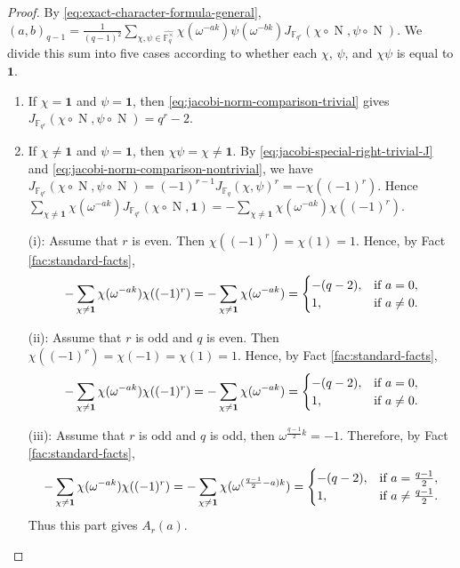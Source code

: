 \documentclass[10pt,a4paper]{article}
\newcommand{\Norm}{\operatorname{N}}
\newcommand{\one}{\mathbf{1}}
\numberwithin{equation}{section}
\begin{document}
\begin{proof}
By \eqref{eq:exact-character-formula-general},
$(a,b)_{q-1}=\frac{1}{(q-1)^2}\sum_{\chi,\psi\in\widehat{\mathbb{F}_q^\times}}\chi(\omega^{-ak})\psi(\omega^{-bk})J_{\mathbb{F}_{q^r}}(\chi\circ \Norm,\psi\circ \Norm)$.
We divide this sum into five cases according to whether each $\chi$, $\psi$, and $\chi\psi$ is equal to $\one$.

\begin{enumerate}
\item[\textup{(1)}:]
If $\chi=\one$ and $\psi=\one$, then \eqref{eq:jacobi-norm-comparison-trivial} gives
$J_{\mathbb{F}_{q^r}}(\chi\circ \Norm,\psi\circ \Norm)=q^r-2$.

\item[\textup{(2)}:]
If $\chi\neq \one$ and $\psi=\one$, then $\chi\psi=\chi\neq \one$. By \eqref{eq:jacobi-special-right-trivial-J} and \eqref{eq:jacobi-norm-comparison-nontrivial}, we have
$J_{\mathbb{F}_{q^r}}(\chi\circ \Norm,\psi\circ \Norm)=(-1)^{r-1}J_{\mathbb{F}_q}(\chi,\psi)^r=-\chi((-1)^r)$. Hence
$\sum_{\chi\neq\one}
\chi(\omega^{-ak})
J_{\mathbb{F}_{q^r}}(\chi\circ\Norm,\one)
=
-\sum_{\chi\neq\one}\chi(\omega^{-ak})\chi((-1)^r)$.

\textup{(i):} Assume that $r$ is even. Then $\chi((-1)^r)=\chi(1)=1$. Hence, by Fact \ref{fac:standard-facts},
\[
-\sum_{\chi\neq\one}\chi(\omega^{-ak})\chi((-1)^r)
=
-\sum_{\chi\neq\one}\chi(\omega^{-ak})
=
\begin{cases}
-(q-2), & \textup{if } a=0,\\
1, & \textup{if } a\neq0.
\end{cases}
\]

\textup{(ii):} Assume that $r$ is odd and $q$ is even. Then $\chi((-1)^r)=\chi(-1)=\chi(1)=1$. Hence, by Fact \ref{fac:standard-facts},
\[
-\sum_{\chi\neq\one}\chi(\omega^{-ak})\chi((-1)^r)
=
-\sum_{\chi\neq\one}\chi(\omega^{-ak})
=
\begin{cases}
-(q-2), & \textup{if } a=0,\\
1, & \textup{if } a\neq0.
\end{cases}
\]

\textup{(iii):} Assume that $r$ is odd and $q$ is odd, then $\omega^{\frac{q-1}{2}k}=-1$. Therefore, by Fact \ref{fac:standard-facts},
\[
-\sum_{\chi\neq\one}\chi(\omega^{-ak})\chi((-1)^r)
=
-\sum_{\chi\neq\one}\chi(\omega^{(\frac{q-1}{2}-a)k})
=
\begin{cases}
-(q-2), & \textup{if } a=\frac{q-1}{2},\\
1, & \textup{if } a\neq\frac{q-1}{2}.
\end{cases}
\]
Thus this part gives $A_r(a)$.


\end{enumerate}
\end{proof}
\end{document}
